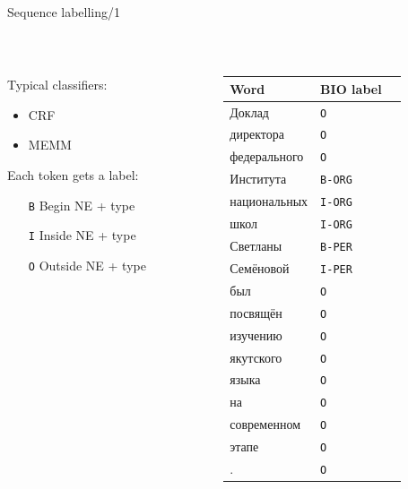 \documentclass[10pt, compress]{beamer}
\begin{document}
\begin{frame}{Sequence labelling/1}

~\\

\begin{columns}
\begin{column}{0.48\textwidth}
Typical classifiers:
\begin{itemize}
\item CRF
\item MEMM
\end{itemize}

Each token gets a label:
\begin{itemize}
\item [{\tt B}] Begin NE + type
\item [{\tt I}] Inside NE + type
\item [{\tt O}] Outside NE + type
\end{itemize}
\end{column}
\begin{column}{0.48\textwidth}
{\small 
\begin{tabular}{lll}
\textbf{Word} & \textbf{BIO label} \\
\hline
Доклад & {\tt O} \\
директора & {\tt O} \\
федерального & {\tt O} \\
Института & {\tt B-ORG} \\
национальных & {\tt I-ORG} \\
школ & {\tt I-ORG} \\
Светланы & {\tt B-PER} \\
Семёновой & {\tt I-PER} \\
был & {\tt O} \\
посвящён & {\tt O} \\
изучению & {\tt O} \\
якутского & {\tt O} \\
языка & {\tt O} \\
на & {\tt O} \\
современном & {\tt O} \\
этапе & {\tt O} \\
. & {\tt O} \\
\end{tabular}
}
\end{column}

\end{columns}
\end{frame}
\end{document}
